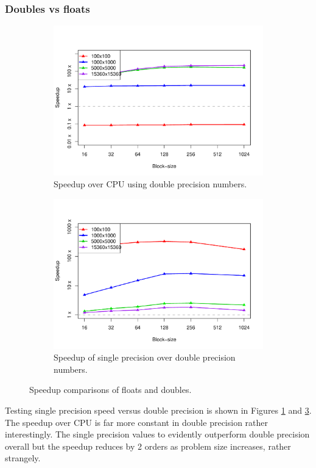 \documentclass[12pt]{article}
\begin{document}
\subsubsection*{Doubles vs floats}
\begin{figure}
	\centering
	\begin{subfigure}{0.48\linewidth}
		\centering
		\includegraphics[width=0.85\linewidth]{../plots/tot_double.pdf}
		\caption{Speedup over CPU using double precision numbers.}
		\label{fig:12}
	\end{subfigure}\hfill
	\begin{subfigure}{0.48\linewidth}
		\centering
		\includegraphics[width=0.85\linewidth]{../plots/tot_doublevfloat.pdf}
		\caption{Speedup of single precision over double precision numbers.}
		\label{fig:13}
	\end{subfigure}
	\caption{Speedup comparisons of floats and doubles.}
\end{figure}
Testing single precision speed versus double precision is shown in Figures \ref{fig:12} and \ref{fig:13}. The speedup over CPU is far more constant in double precision rather interestingly. The single precision values to evidently outperform double precision overall but the speedup reduces by 2 orders as problem size increases, rather strangely.
\end{document}
